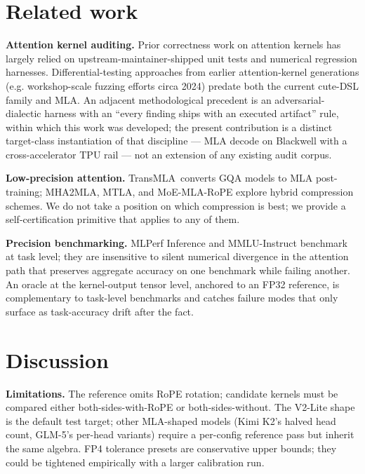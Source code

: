 \documentclass[11pt]{article}
\begin{document}
\section{Related work}
\label{sec:related}

\textbf{Attention kernel auditing.} Prior correctness work on attention
kernels has largely relied on upstream-maintainer-shipped unit tests
and numerical regression harnesses. Differential-testing approaches
from earlier attention-kernel generations (e.g. workshop-scale
fuzzing efforts circa 2024) predate both the current cute-DSL family
and MLA. An adjacent methodological precedent is an adversarial-dialectic
harness with an ``every finding ships with an executed artifact'' rule,
within which this work was developed; the present contribution is a
distinct target-class instantiation of that discipline --- MLA decode
on Blackwell with a cross-accelerator TPU rail --- not an extension of
any existing audit corpus.

\textbf{Low-precision attention.} TransMLA\,\citep{transmla} converts
GQA models to MLA post-training; MHA2MLA, MTLA, and MoE-MLA-RoPE
explore hybrid compression schemes. We do not take a position on which
compression is best; we provide a self-certification primitive that
applies to any of them.

\textbf{Precision benchmarking.} MLPerf Inference and MMLU-Instruct
benchmark at task level; they are insensitive to silent numerical
divergence in the attention path that preserves aggregate accuracy on
one benchmark while failing another. An oracle at the kernel-output
tensor level, anchored to an FP32 reference, is complementary to
task-level benchmarks and catches failure modes that only surface as
task-accuracy drift after the fact.

\section{Discussion}
\label{sec:discussion}

\textbf{Limitations.} The reference omits RoPE rotation; candidate
kernels must be compared either both-sides-with-RoPE or
both-sides-without. The V2-Lite shape is the default test target; other
MLA-shaped models (Kimi K2's halved head count, GLM-5's per-head
variants) require a per-config reference pass but inherit the same
algebra. FP4 tolerance presets are conservative upper bounds; they
could be tightened empirically with a larger calibration run.
\end{document}
